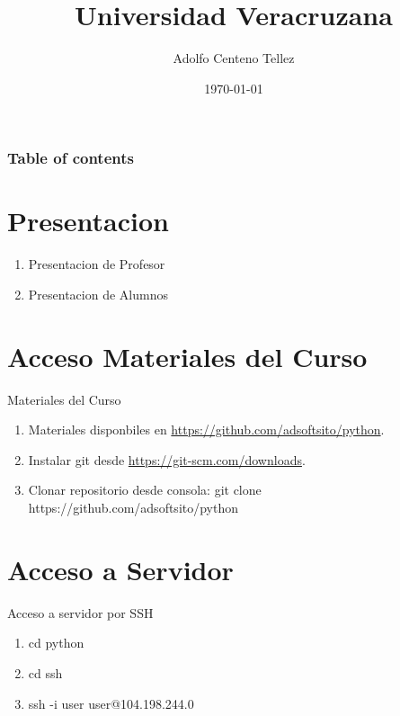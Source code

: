 \documentclass{beamer}
\begin{document}
\title{Universidad Veracruzana}  
\author{Adolfo Centeno Tellez}
\date{\today} 

\begin{frame}
\titlepage
\end{frame}

\begin{frame}\frametitle{Table of contents}
\tableofcontents
\end{frame} 


\section{Presentacion}

\begin{frame} 

\begin{enumerate}
\item
 Presentacion de Profesor
\item
 Presentacion de Alumnos
\end{enumerate} 


\end{frame}


\section{Acceso Materiales del Curso}

\begin{frame}

Materiales del Curso

\begin{enumerate}
\item
	Materiales disponbiles en \href{https://github.com/adsoftsito/python}{https://github.com/adsoftsito/python}.
\item
    Instalar git desde \href{https://git-scm.com/downloads}{https://git-scm.com/downloads}.
\item
	Clonar repositorio desde consola: 
 	git clone https://github.com/adsoftsito/python

\end{enumerate} 


\end{frame}


\section{Acceso a Servidor}

\begin{frame}


Acceso a servidor por SSH

\begin{enumerate}
\item
	cd python
\item
	cd ssh
\item
	ssh -i user user@104.198.244.0
\end{enumerate} 


\end{frame}
\end{document}
